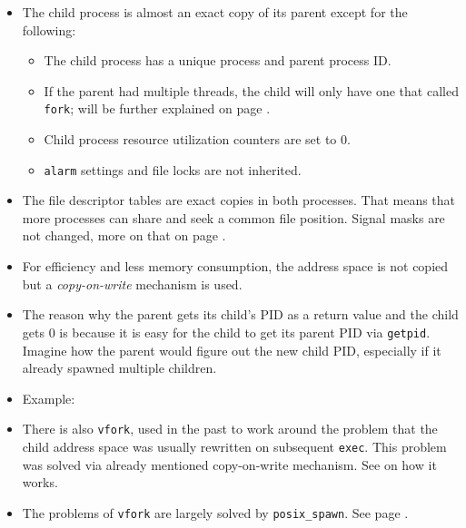 
\begin{slide}
\begin{center}

\end{center}
\end{slide}

\begin{itemize}
\item \label{FORK} The child process is almost an exact copy of its parent
except for the following:
\begin{itemize}
\item The child process has a unique process and parent process ID.
\item If the parent had multiple threads, the child will only have one that
called \texttt{fork}; will be further explained on page \pageref{FORKALL}.
\item Child process resource utilization counters are set to 0.
\item \texttt{alarm} settings and file locks are not inherited.
\end{itemize}
\item The file descriptor tables are exact copies in both processes.  That means
that more processes can share and seek a common file position.  Signal masks are
not changed, more on that on page \pageref{SIGNALBLOCKINGEXAMPLE}.
\item For efficiency and less memory consumption, the address space is not copied
but a \emph{copy-on-write} mechanism is used.
\item The reason why the parent gets its child's PID as a return value and the
child gets 0 is because it is easy for the child to get its parent PID via
\texttt{getpid}.  Imagine how the parent would figure out the new child PID,
especially if it already spawned multiple children.
\item Example: 
\item \label{VFORK} There is also \texttt{vfork}, used in the past to work
around the problem that the child address space was usually rewritten on
subsequent \texttt{exec}.  This problem was solved via already mentioned
copy-on-write mechanism.  See  on how it works.
\item The problems of \texttt{vfork} are largely solved by
\texttt{posix\_spawn}. See page \pageref{SPAWN}.
\end{itemize}

